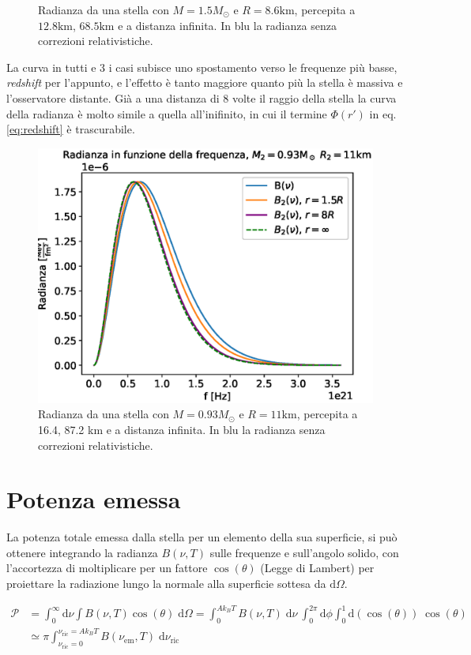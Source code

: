\documentclass[a4paper, titlepage]{article}
\begin{document}
\begin{figure}[h]
\begin{minipage}{0.49\textwidth}
        \caption{Radianza da una stella con $M = 1.5M_\odot$ e $R = 8.6\unit{\kilo\meter}$, percepita a $12.8 \unit{\kilo\meter}$, $68.5 \unit{\kilo\meter}$ e a distanza infinita.
        In blu la radianza senza correzioni relativistiche.\\}
        \label{fig:rad2}
    \end{minipage}
\end{figure}

La curva in tutti e 3 i casi subisce uno spostamento verso le frequenze più basse, \textit{redshift} per l'appunto, e l'effetto è tanto maggiore quanto più la stella è massiva e l'osservatore distante. Già a una distanza di 8 volte il raggio della stella la curva della radianza è molto simile a quella all'inifinito, in cui il termine $\Phi (r')$ in eq. \ref{eq:redshift} è trascurabile.
\begin{figure}[h]
    \centering
    \includegraphics[width = 0.6 \textwidth]{Figures/radianza2.eps}
    \caption{Radianza da una stella con $M = 0.93M_\odot$ e $R = 11\unit{\kilo\meter}$, percepita a 16.4, 87.2 \unit{\kilo\meter} e a distanza infinita.
    In blu la radianza senza correzioni relativistiche.}
    \label{fig:rad3}
\end{figure}



\section{Potenza emessa}
La potenza totale emessa dalla stella per un elemento della sua superficie, si può ottenere integrando la radianza $B(\nu, T)$ sulle frequenze e sull'angolo solido, con l'accortezza di moltiplicare per un fattore $\cos(\theta)$ (Legge di Lambert) per proiettare la radiazione lungo la normale alla superficie sottesa da $\mathrm{d}\Omega$.

\begin{align}
    \mathcal P &= \int_0^\infty \mathrm{d}\nu \int B(\nu, T) \cos(\theta) \; \mathrm{d}\Omega
    =  \int_0^{A k_B T} B(\nu, T) \; \mathrm{d}\nu ~ 
    \int_0^{2 \pi} \mathrm{d}\phi \int_0^1 \mathrm{d}(\cos(\theta)) \; \cos(\theta) \\
    &\simeq \pi \int_{\nu_\text{ric} = 0}^{\nu_\text{ric} = A k_B T} B(\nu_\text{em}, T) \; \mathrm{d}\nu_\text{ric}
    \label{eq:Pot}
\end{align}
\end{document}
